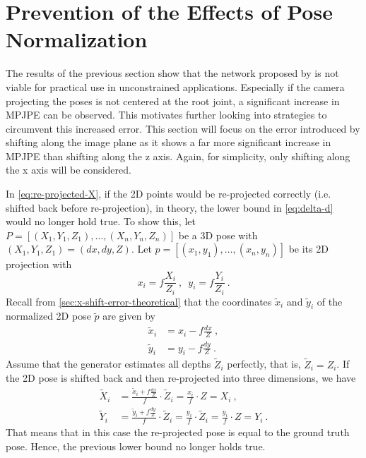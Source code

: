 \section{Prevention of the Effects of Pose Normalization}
\label{sec:network-adjusting}

The results of the previous section show that the network proposed by \citet{drover18} is not viable for practical use in unconstrained applications.
Especially if the camera projecting the poses is not centered at the root joint, a significant increase in MPJPE can be observed.
This motivates further looking into strategies to circumvent this increased error.
This section will focus on the error introduced by shifting along the image plane as it shows a far more significant increase in MPJPE than shifting along the z axis.
Again, for simplicity, only shifting along the x axis will be considered.

In \autoref{eq:re-projected-X}, if the 2D points would be re-projected correctly (i.e. shifted back before re-projection), in theory, the lower bound in \autoref{eq:delta-d} would no longer hold true.
To show this, let $P = [(X_1, Y_1, Z_1), \dotsc, (X_n, Y_n, Z_n)]$ be a 3D pose with $(X_1, Y_1, Z_1) = (dx, dy, Z)$.
Let $p = [(x_1, y_1), \dotsc, (x_n, y_n)]$ be its 2D projection with
\begin{equation}
	x_i = f \frac{X_i}{Z_i} \ ,\enspace y_i = f \frac{Y_i}{Z_i} \ .
\end{equation}
Recall from \autoref{sec:x-shift-error-theoretical} that the coordinates $\widetilde{x}_i$ and $\widetilde{y}_i$ of the normalized 2D pose $\widetilde{p}$ are given by
\begin{align}
	\widetilde{x}_i &= x_i - f \frac{dx}{Z} \ ,\\
	\widetilde{y}_i &= y_i - f \frac{dy}{Z} \ .
\end{align}
Assume that the generator estimates all depths $\widetilde{Z}_i$ perfectly, that is, $\widetilde{Z}_i = Z_i$.
If the 2D pose is shifted back and then re-projected into three dimensions, we have
\begin{align}
	\widetilde{X}_i &= \frac{\widetilde{x}_i +  f \frac{dx}{Z}}{f} \cdot \widetilde{Z}_i = \frac{x_i}{f} \cdot Z  = X_i\ ,\\
	\widetilde{Y}_i &= \frac{\widetilde{y}_i +  f \frac{dy}{Z}}{f} \cdot \widetilde{Z}_i= \frac{y_i}{f} \cdot \widetilde{Z}_i  = \frac{y_i}{f} \cdot Z = Y_i \ .
\end{align}
That means that in this case the re-projected pose is equal to the ground truth pose.
Hence, the previous lower bound no longer holds true.

